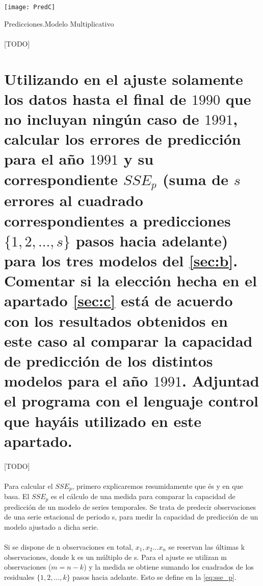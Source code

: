 \documentclass[a4paper, spanish]{article}
\begin{document}
    \begin{table}[htb!]
      \centering
      \texttt{[image: PredC]}
      \caption{Predicciones.Modelo Multiplicativo}
      \label{}
    \end{table}

    \paragraph{}
    [TODO]

  \section{Utilizando en el ajuste solamente los datos hasta el final de $1990$ que no incluyan ningún caso de $1991$, calcular los errores de predicción para el año $1991$ y su correspondiente $SSE_p$ (suma de $s$ errores al cuadrado correspondientes a predicciones $\{1, 2, ..., s\}$ pasos hacia adelante) para los tres modelos del \autoref{sec:b}. Comentar si la elección hecha en el apartado \autoref{sec:c} está de acuerdo con los resultados obtenidos en este caso al comparar la capacidad de predicción de los distintos modelos para el año $1991$. Adjuntad el programa con el lenguaje control que hayáis utilizado en este apartado.}
  \label{sec:d}

    \paragraph{}
    [TODO]

    \paragraph{}
    Para calcular el $SSE_p$, primero explicaremos resumidamente que és y en que basa. El $SSE_p$ es el cálculo de una medida para comparar la capacidad de predicción de un modelo de series temporales.
    Se trata de predecir observaciones de una serie estacional de periodo s, para
    medir la capacidad de predicción de un modelo ajustado a dicha serie.

    \paragraph{}
    Si se dispone de n observaciones en total, $x_1,x_2...x_n$ se reservan las últimas k observaciones, donde k es un múltiplo de s. Para el ajuste se utilizan m observaciones ($m = n - k$) y la medida se obtiene sumando los cuadrados de los residuales $\{1, 2, ..., k\}$ pasos hacia adelante. Esto se define en la \autoref{eq:sse_p}.
\end{document}
